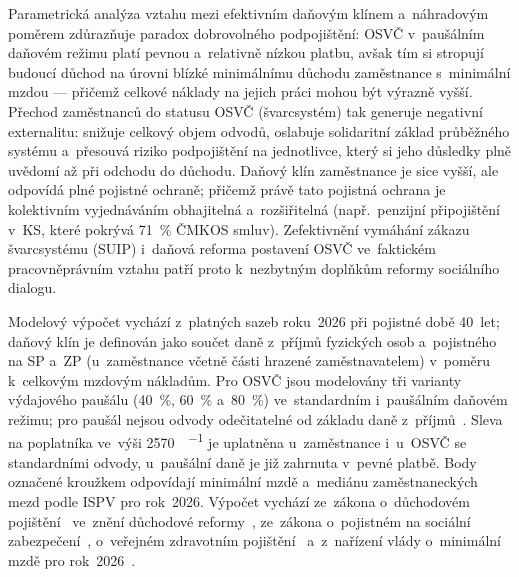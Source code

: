 Parametrická analýza vztahu mezi efektivním daňovým klínem a~náhradovým poměrem zdůrazňuje paradox dobrovolného podpojištění: \ac{OSVČ} v~paušálním daňovém režimu platí pevnou a~relativně nízkou platbu, avšak tím si stropují budoucí důchod na úrovni blízké minimálnímu důchodu zaměstnance s~minimální mzdou --- přičemž celkové náklady na jejich práci mohou být výrazně vyšší.
Přechod zaměstnanců do statusu \ac{OSVČ} (švarcsystém) tak generuje negativní externalitu: snižuje celkový objem odvodů, oslabuje solidaritní základ průběžného systému a~přesouvá riziko podpojištění na jednotlivce, který si jeho důsledky plně uvědomí až při odchodu do důchodu.
Daňový klín zaměstnance je sice vyšší, ale odpovídá plné pojistné ochraně; přičemž právě tato pojistná ochrana je kolektivním vyjednáváním obhajitelná a~rozšiřitelná (např.\ penzijní připojištění v~\ac{KS}, které pokrývá \SI{71}{\percent} \ac{ČMKOS} smluv).
Zefektivnění vymáhání zákazu švarcsystému (\ac{SUIP}) i~daňová reforma postavení \ac{OSVČ} ve~faktickém pracovněprávním vztahu patří proto k~nezbytným doplňkům reformy sociálního dialogu.

Modelový výpočet vychází z~platných sazeb roku~2026 při pojistné době 40~let; daňový klín je definován jako součet daně z~příjmů fyzických osob a~pojistného na \acs{SP} a~\acs{ZP} (u~zaměstnance včetně části hrazené zaměstnavatelem) v~poměru k~celkovým mzdovým nákladům. Pro \acs{OSVČ} jsou modelovány tři varianty výdajového paušálu (\SI{40}{\percent}, \SI{60}{\percent} a~\SI{80}{\percent}) ve~standardním i~paušálním daňovém režimu; pro paušál nejsou odvody odečitatelné od základu daně z~příjmů~\cite{zakon_zdp_1992}. Sleva na poplatníka ve~výši \SI{2570}{\czk\per\month} je uplatněna u~zaměstnance i~u~\acs{OSVČ} se standardními odvody, u~paušální daně je již zahrnuta v~pevné platbě. Body označené kroužkem odpovídají minimální mzdě a~mediánu zaměstnaneckých mezd podle \ac{ISPV} pro rok~2026. Výpočet vychází ze~zákona o~důchodovém pojištění~\cite{zakon_zpds_1995} ve~znění důchodové reformy~\cite{zakon_duchreforma_2023}, ze~zákona o~pojistném na sociální zabezpečení~\cite{zakon_sp_1992}, o~veřejném zdravotním pojištění~\cite{zakon_zp_1992} a~z~nařízení vlády o~minimální mzdě pro rok~2026~\cite{nv_365_2025}.\par


